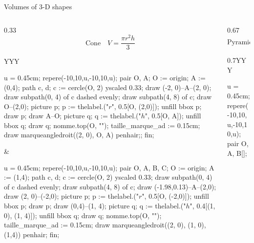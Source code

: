\documentclass[9pt,aspectratio=169]{beamer}
\begin{document}
\begin{frame}{Volumes of 3-D shapes}
\begin{columns}[T]
\begin{column}{0.33\textwidth}
      \bigskip
      \[ \text{Cone} \quad V = \frac{\pi r^2 h}{3} \]
      \begin{tabularx}{\textwidth}{YYY}
        \begin{mplibcode}
          u = 0.45cm;
          repere(-10,10,u,-10,10,u);
            pair O, A;
            O := origin;
            A := (0,4);
            path c, d;
            c := cercle(O, 2) yscaled 0.33;
            draw (-2, 0)--A--(2, 0);
            draw subpath(0, 4) of c dashed evenly;
            draw subpath(4, 8) of c;
            draw O--(2,0);
            picture p;
            p := thelabel.("$r$", 0.5[O, (2,0)]);
            unfill bbox p;
            draw p;
            draw A--O;
            picture q;
            q := thelabel.("$h$", 0.5[O, A]);
            unfill bbox q;
            draw q;
            nomme.top(O, "");
            taille_marque_ad := 0.15cm;
            draw marqueangledroit((2, 0), O, A) penhair;;
          fin;
        \end{mplibcode}
        &
        \hspace*{1em}
        \begin{mplibcode}
          u = 0.45cm;
          repere(-10,10,u,-10,10,u);
            pair O, A, B, C;
            O := origin;
            A := (1,4);
            path c, d;
            c := cercle(O, 2) yscaled 0.33;
            draw subpath(0, 4) of c dashed evenly;
            draw subpath(4, 8) of c;        
            draw (-1.98,0.13)--A--(2,0);
            draw (2, 0)--(-2,0);
            picture p;
            p := thelabel.("$r$", 0.5[O, (-2,0)]);
            unfill bbox p;
            draw p;
            draw (0,4)--(1, 4);
            picture q;
            q := thelabel.("$h$", 0.4[(1, 0), (1, 4)]);
            unfill bbox q;
            draw q;
            nomme.top(O, "");
            taille_marque_ad := 0.15cm;
            draw marqueangledroit((2, 0), (1, 0), (1,4)) penhair;
          fin;
        \end{mplibcode}
      \end{tabularx}
    \end{column}
    \begin{column}{0.67\textwidth}
      \[ \text{Pyramid} \quad V = \frac{\text{Base Area}\times h}{3} \]
      \begin{center}
        \begin{tabularx}{0.7\textwidth}{YYY}
          \begin{mplibcode}
            u = 0.45cm;
            repere(-10,10,u,-10,10,u);
              pair O, A, B[];

\end{mplibcode}
\end{tabularx}
\end{center}
\end{column}
\end{columns}
\end{frame}
\end{document}
